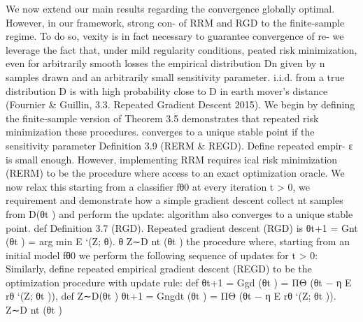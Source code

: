 \documentclass[10pt]{article}
\begin{document}
\begin{ReviewVerbatim}

                                                                              We now extend our main results regarding the convergence
globally optimal. However, in our framework, strong con-
                                                                              of RRM and RGD to the ﬁnite-sample regime. To do so,
vexity is in fact necessary to guarantee convergence of re-
                                                                              we leverage the fact that, under mild regularity conditions,
peated risk minimization, even for arbitrarily smooth losses
                                                                              the empirical distribution Dn given by n samples drawn
and an arbitrarily small sensitivity parameter.
                                                                              i.i.d. from a true distribution D is with high probability
                                                                              close to D in earth mover’s distance (Fournier & Guillin,
3.3. Repeated Gradient Descent
                                                                              2015). We begin by deﬁning the ﬁnite-sample version of
Theorem 3.5 demonstrates that repeated risk minimization                      these procedures.
converges to a unique stable point if the sensitivity parameter               Deﬁnition 3.9 (RERM & REGD). Deﬁne repeated empir-
ε is small enough. However, implementing RRM requires                         ical risk minimization (RERM) to be the procedure where
access to an exact optimization oracle. We now relax this                     starting from a classiﬁer fθ0 at every iteration t > 0, we
requirement and demonstrate how a simple gradient descent                     collect nt samples from D(θt ) and perform the update:
algorithm also converges to a unique stable point.
                                                                                                       def
Deﬁnition 3.7 (RGD). Repeated gradient descent (RGD) is                            θt+1 = Gnt (θt ) = arg min              E       `(Z; θ).
                                                                                                             θ      Z∼D nt (θt )
the procedure where, starting from an initial model fθ0 we
perform the following sequence of updates for t > 0:                          Similarly, deﬁne repeated empirical gradient descent
                                                                              (REGD) to be the optimization procedure with update rule:
                        def
   θt+1 = Ggd (θt ) = ΠΘ (θt − η               E    rθ `(Z; θt )),                               def
                                         Z∼D(θt )                               θt+1 = Gngdt (θt ) = ΠΘ (θt − η        E         rθ `(Z; θt )).
                                                                                                                  Z∼D nt (θt )


\end{ReviewVerbatim}
\end{document}
